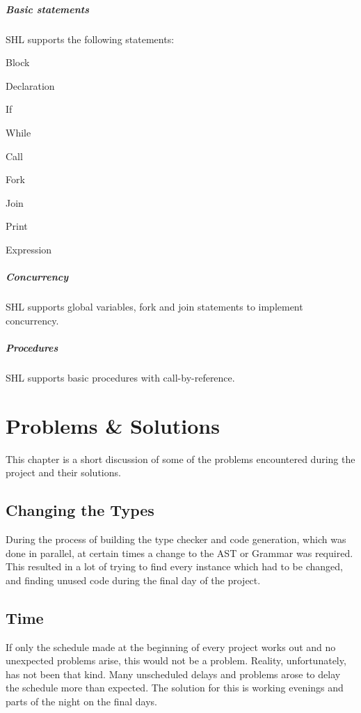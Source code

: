 \documentclass[twoside]{report}
\begin{document}
\paragraph{Basic statements} SHL supports the following statements: 
\begin{compactitem}
	\item Block
	\item Declaration
	\item If 
	\item While
	\item Call
	\item Fork 
	\item Join
	\item Print
	\item Expression
\end{compactitem}
\paragraph{Concurrency} SHL supports global variables, fork and join statements to implement concurrency.
\paragraph{Procedures} SHL supports basic procedures with call-by-reference.


\chapter{Problems \& Solutions}
\label{problems_and_solutions}
This chapter is a short discussion of some of the problems encountered during the project and their solutions.

\section{Changing the Types}
During the process of building the type checker and code generation, which was done in parallel, at certain times a change to the AST or Grammar was required. This resulted in a lot of trying to find every instance which had to be changed, and finding unused code during the final day of the project.

\section{Time}
If only the schedule made at the beginning of every project works out and no unexpected problems arise, this would not be a problem. Reality, unfortunately, has not been that kind. Many unscheduled delays and problems arose to delay the schedule more than expected. The solution for this is working evenings and parts of the night on the final days.
\end{document}
